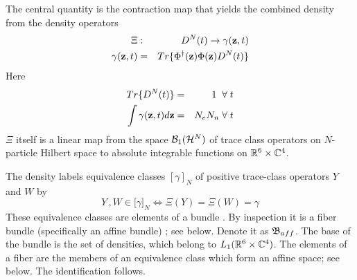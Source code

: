 The central quantity is the contraction map that yields the combined density
from the density operators 
\begin{eqnarray}
\Xi &:&D^{N}(t)\rightarrow \gamma ({\bf z},t)  \nonumber \\
\gamma ({\bf z},t) &=&Tr\{\Phi ^{\dagger }({\bf z})\Phi ({\bf z})D^{N}(t)\}
\label{Xidefn}
\end{eqnarray}%
Here 
\begin{eqnarray}
Tr\{D^{N}(t)\} &=&1\;\;\forall \;t  \nonumber \\
\int \gamma ({\bf z},t)d{\bf z} &=&N_{e}N_{n}\;\forall \;t
\end{eqnarray}%
$\Xi $ itself is a linear map from the space ${\cal B}_{1}({\cal H}^{N})$ of
trace class operators on $N$-particle Hilbert space to absolute integrable
functions on ${\Bbb R}^{6}\times {\Bbb C}^{4}$.

The density labels equivalence classes $[\gamma ]_{N}$ of positive
trace-class operators $Y$ and $W$ by 
\begin{equation}
Y\,,W\in \lbrack \gamma ]_{N}\Leftrightarrow \Xi (Y)=\Xi (W)=\gamma
\end{equation}%
These equivalence classes are elements of a bundle \cite{Bruhat}. By
inspection it is a fiber bundle (specifically an affine bundle) \cite%
{affinebundleref}; see below. Denote it as ${\frak B}_{aff}$. The base of
the bundle is the set of densities, which belong to $L_{1}({\Bbb R}%
^{6}\times {\Bbb C}^{4})$. The elements of a fiber are the members of an
equivalence class which form an affine space; see below. The identification
follows.

